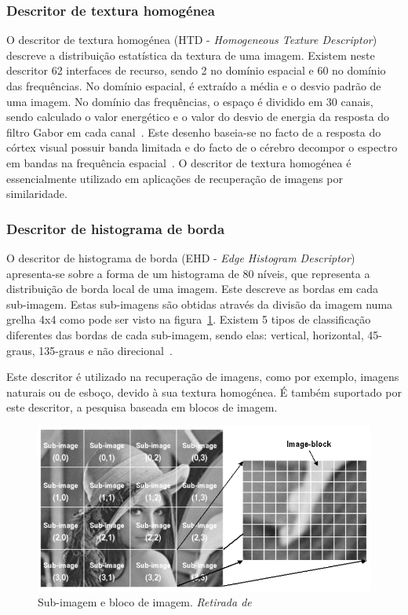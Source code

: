 \subsubsection{Descritor de textura homogénea}

O descritor de textura homogénea (HTD - \textit{Homogeneous Texture Descriptor}) descreve a distribuição estatística da textura de uma imagem. Existem neste descritor 62 interfaces de recurso, sendo 2 no domínio espacial e 60 no domínio das frequências. No domínio espacial, é extraído a média e o desvio padrão de uma imagem. No domínio das frequências, o espaço é dividido em 30 canais, sendo calculado o valor energético e o valor do desvio de energia da resposta do filtro Gabor em cada canal~\cite{Wu2001, Shao2009}. Este desenho baseia-se no facto de a resposta do córtex visual possuir banda limitada e do facto de o cérebro decompor o espectro em bandas na frequência espacial~\cite{Wu2001}.
O descritor de textura homogénea é essencialmente utilizado em aplicações de recuperação de imagens por similaridade. 

\subsubsection{Descritor de histograma de borda}

O descritor de histograma de borda (EHD - \textit{Edge Histogram Descriptor}) apresenta-se sobre a forma de um histograma de 80 níveis, que representa a distribuição de borda local de uma imagem. Este descreve as bordas em cada sub-imagem. Estas sub-imagens são obtidas através da divisão da imagem numa grelha 4x4 como pode ser visto na figura~\ref{fig:ehd}. Existem 5 tipos de classificação diferentes das bordas de cada sub-imagem, sendo elas: vertical, horizontal, 45-graus, 135-graus e não direcional~\cite{Wu2001}. 

Este descritor é utilizado na recuperação de imagens, como por exemplo, imagens naturais ou de esboço, devido à sua textura homogénea. É também suportado por este descritor, a pesquisa baseada em blocos de imagem.  

\begin{figure}
\centering
\includegraphics[width=0.7\linewidth]{./figures/ehd}
\caption{Sub-imagem e bloco de imagem. \textit{Retirada de}~\cite{Wu2001}}
\label{fig:ehd}
\end{figure}

